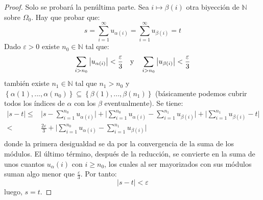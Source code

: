 \documentclass[12pt]{report}
\theoremstyle{largebreak}
\newcommand\abs[1]{\ensuremath{\big|#1\big|}}
\begin{document}
    \begin{proof}
        Solo se probará la penúltima parte. Sea $i\mapsto\beta(i)$ otra biyección de $\mathbb{N}$ sobre $\Omega_0$. Hay que probar que:
        \begin{equation*}
            s=\sum_{i=1 }^{\infty}u_{\alpha(i)}=\sum_{i=1 }^{\infty}u_{\beta(i)}=t
        \end{equation*}
        Dado $\varepsilon>0$ existe $n_0\in\mathbb{N}$ tal que:
        \begin{equation*}
            \sum_{i>n_0 }\abs{u_{\alpha(i)} }<\frac{\varepsilon}{3}\quad\textup{y}\quad \sum_{i>n_0 }\abs{u_{\beta(i)} }<\frac{\varepsilon}{3}
        \end{equation*}
        también existe $n_1\in\mathbb{N}$ tal que $n_1>n_0$ y $\left\{\alpha(1),...,\alpha(n_0)\right\}\subseteq\left\{\beta(1),...,\beta(n_1) \right\}$ (básicamente podemos cubrir todos los índices de $\alpha$ con los $\beta$ eventualmente). Se tiene:
        \begin{equation*}
            \begin{split}
                \abs{s-t}\leq&\abs{s-\sum_{i=1 }^{n_0}u_{\alpha(i)}}+\abs{\sum_{i=1 }^{n_0 }u_{\alpha(i)}-\sum_{i=1 }^{n_1 }u_{\beta(i)}}+\abs{\sum_{i=1 }^{n_1}u_{\beta(i)}-t} \\
                < &\frac{2\varepsilon}{3}+\abs{\sum_{i=1 }^{n_0 }u_{\alpha(i)}-\sum_{i=1 }^{n_1 }u_{\beta(i)}}\\
            \end{split}
        \end{equation*}
        donde la primera desigualdad se da por la convergencia de la suma de los módulos. El último término, después de la reducción, se convierte en la suma de unos cuantos $u_\alpha(i)$ con $i\geq n_0$, los cuales al ser mayorizados con sus módulos suman algo menor que $\frac{\varepsilon}{3}$. Por tanto:
        \begin{equation*}
            \abs{s-t}<\varepsilon
        \end{equation*}
        luego, $s=t$.
    \end{proof}
\end{document}

